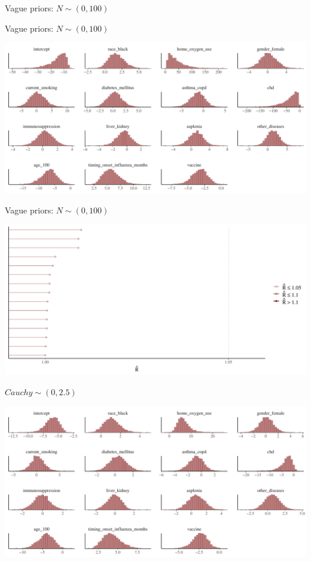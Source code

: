 \documentclass[ignorenonframetext,a4paper]{beamer}
\begin{document}
\begin{frame}{Vague priors: \(N \sim \left( 0, 100 \right)\)}

\end{frame}

\begin{frame}{Vague priors: \(N \sim \left( 0, 100 \right)\)}

\includegraphics{DB_presentation_case_study_files/figure-beamer/unnamed-chunk-29-1.pdf}

\end{frame}

\begin{frame}{Vague priors: \(N \sim \left( 0, 100 \right)\)}

\includegraphics{DB_presentation_case_study_files/figure-beamer/unnamed-chunk-30-1.pdf}

\end{frame}

\begin{frame}{\(Cauchy \sim \left( 0, 2.5 \right)\)}

\includegraphics{DB_presentation_case_study_files/figure-beamer/unnamed-chunk-31-1.pdf}

\end{frame}
\end{document}
